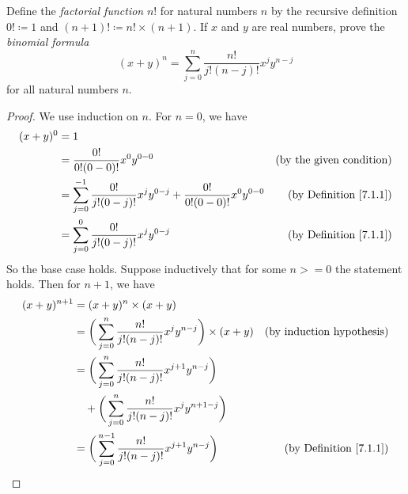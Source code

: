 \begin{exercise}\label{ex 7.1.4}
    Define the \emph{factorial function} \(n!\) for natural numbers \(n\) by the recursive definition \(0! \coloneqq 1\) and \((n + 1)! \coloneqq n! \times (n + 1)\).
    If \(x\) and \(y\) are real numbers, prove the \emph{binomial formula}
    \[
        (x + y)^n = \sum_{j = 0}^n \frac{n!}{j!(n - j)!} x^j y^{n - j}
    \]
    for all natural numbers \(n\).
\end{exercise}

\begin{proof}
    We use induction on \(n\).
    For \(n = 0\), we have
    \begin{align*}
        (x + y)^0 & = 1                                                                                                                                \\
                  & = \frac{0!}{0!(0 - 0)!} x^0 y^{0 - 0}                                                         & \text{(by the given condition)}    \\
                  & = \sum_{j = 0}^{-1} \frac{0!}{j!(0 - j)!} x^j y^{0 - j} + \frac{0!}{0!(0 - 0)!} x^0 y^{0 - 0} & \text{(by Definition \ref{7.1.1})} \\
                  & = \sum_{j = 0}^0 \frac{0!}{j!(0 - j)!} x^j y^{0 - j}                                          & \text{(by Definition \ref{7.1.1})}
    \end{align*}
    So the base case holds.
    Suppose inductively that for some \(n >= 0\) the statement holds.
    Then for \(n + 1\), we have
    \begin{align*}
        (x + y)^{n + 1} & = (x + y)^n \times (x + y)                                                                                                      \\
                        & = \bigg(\sum_{j = 0}^n \frac{n!}{j!(n - j)!} x^j y^{n - j}\bigg) \times (x + y)            & \text{(by induction hypothesis)}   \\
                        & = \bigg(\sum_{j = 0}^n \frac{n!}{j!(n - j)!} x^{j + 1} y^{n - j}\bigg)                                                          \\
                        & \quad + \bigg(\sum_{j = 0}^n \frac{n!}{j!(n - j)!} x^j y^{n + 1 - j}\bigg)                                                      \\
                        & = \bigg(\sum_{j = 0}^{n - 1} \frac{n!}{j!(n - j)!} x^{j + 1} y^{n - j}\bigg)               & \text{(by Definition \ref{7.1.1})} \\

\end{align*}
\end{proof}

